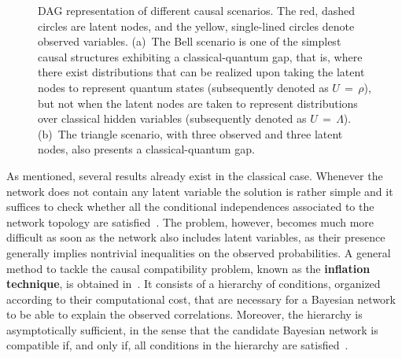 \documentclass[superscriptaddress,aps,prx,nofootinbib,twocolumn,twoside,reprint,letterpaper,longbibliography]{revtex4-2}
\newcommand{\term}[1]{\textcolor{medblue}{\textbf{#1}}}
\begin{document}
\begin{figure}[!b]
  \begin{center}
  \end{center}
  \caption[]{
  DAG representation of different causal scenarios. The red, dashed circles are latent nodes, and the yellow, single-lined circles denote observed variables. %
  (a)~The Bell scenario is one of the simplest causal structures exhibiting a classical-quantum gap, that is, where there exist distributions that can be realized upon taking the latent nodes to represent quantum states (subsequently denoted as $U\,{=}\,\rho$), but not when the latent nodes are taken to represent distributions over classical hidden variables (subsequently denoted as $U\,{=}\,\Lambda$). %
  (b)~The triangle scenario, with three observed and three latent nodes, also presents a classical-quantum gap.
  \label{fig:dag}
  }
\end{figure}

As mentioned, several results already exist in the classical case.
Whenever the network does not contain any latent variable the solution is rather simple and it suffices to check whether all the conditional independences associated to the network topology are satisfied~\cite{pearl}. The problem, however, becomes much more difficult as soon as the network also includes latent variables, as their presence generally implies nontrivial
inequalities on the observed probabilities.
A general method to tackle the causal compatibility problem, known as the \term{inflation technique}, is obtained in~\cite{wolfe2016inflation}. It consists of a hierarchy of conditions, organized according to their computational cost, that are necessary for a Bayesian network to be able to explain the observed correlations. Moreover, the hierarchy is asymptotically sufficient, in the sense that the candidate Bayesian network is compatible if, and only if, all conditions in the hierarchy are satisfied~\cite{navascues2017inflation}.
\end{document}
